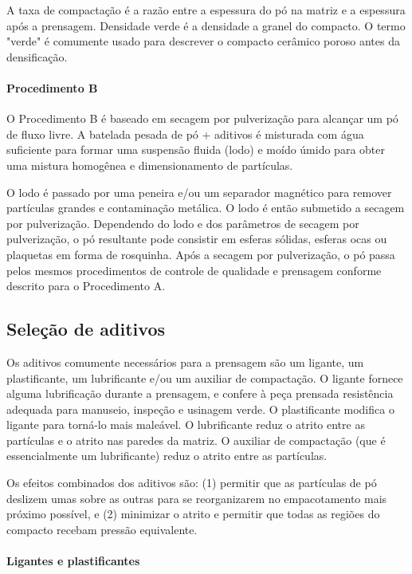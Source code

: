A taxa de compactação é a razão entre a espessura do pó na matriz e a espessura após a prensagem. Densidade verde é a densidade a granel do compacto. O termo "verde" é comumente usado para descrever o compacto cerâmico poroso antes da densificação.

\paragraph*{Procedimento B}

O Procedimento B é baseado em secagem por pulverização para alcançar um pó de fluxo livre. A batelada pesada de pó + aditivos é misturada com água suficiente para formar uma suspensão fluida (lodo) e moído úmido para obter uma mistura homogênea e dimensionamento de partículas.

O lodo é passado por uma peneira e/ou um separador magnético para remover partículas grandes e contaminação metálica. O lodo é então submetido a secagem por pulverização. Dependendo do lodo e dos parâmetros de secagem por pulverização, o pó resultante pode consistir em esferas sólidas, esferas ocas ou plaquetas em forma de rosquinha. Após a secagem por pulverização, o pó passa pelos mesmos procedimentos de controle de qualidade e prensagem conforme descrito para o Procedimento A.

\subsection*{Seleção de aditivos}

Os aditivos comumente necessários para a prensagem são um ligante, um plastificante, um lubrificante e/ou um auxiliar de compactação. O ligante fornece alguma lubrificação durante a prensagem, e confere à peça prensada resistência adequada para manuseio, inspeção e usinagem verde. O plastificante modifica o ligante para torná-lo mais maleável. O lubrificante reduz o atrito entre as partículas e o atrito nas paredes da matriz. O auxiliar de compactação (que é essencialmente um lubrificante) reduz o atrito entre as partículas.

Os efeitos combinados dos aditivos são: (1) permitir que as partículas de pó deslizem umas sobre as outras para se reorganizarem no empacotamento mais próximo possível, e (2) minimizar o atrito e permitir que todas as regiões do compacto recebam pressão equivalente.

\paragraph*{Ligantes e plastificantes}

